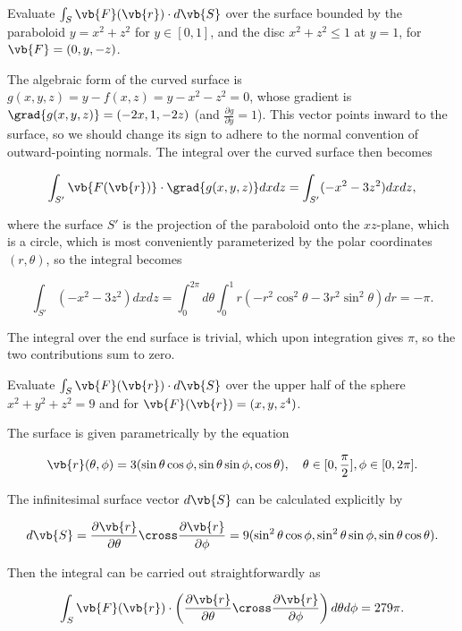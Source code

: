 \documentclass[english,a4paper,12pt]{report}
\begin{document}
{Evaluate \(\int_{S}^{}   \vb{F} (\vb{r} )\cdot d\vb{S} \) over the surface bounded by the paraboloid \(y = x^2+z^2\) for \(y \in [0,1]\), and the disc \(x^2+z^2 \le 1\) at \(y=1\), for \(\vb{F} = (0,y,-z)\).}
{The algebraic form of the curved surface is \(g(x,y,z) = y - f(x,z) = y - x^2 - z^2 = 0\), whose gradient is \(\grad{g(x,y,z)} = (-2x,1,-2z) \) (and \(\frac{\partial g}{\partial y} = 1\)). This vector points inward to the surface, so we should change its sign to adhere to the normal convention of outward-pointing normals. The integral over the curved surface then becomes

\begin{equation}
	\int_{S'}^{}   \vb{F(\vb{r} )} \cdot \grad{g(x,y,z)} dxdz = \int_{S'}^{} (-x^2-3z^2)dxdz,
\end{equation}

where the surface \(S'\) is the projection of the paraboloid onto the \(xz\)-plane, which is a circle, which is most conveniently parameterized by the polar coordinates \((r,\theta )\), so the integral becomes

\begin{equation}
	\int_{S'}^{} (-x^2-3z^2)dxdz = \int_{0}^{2\pi } d \theta \int_{0}^{1} r(-r^2\cos ^2\theta - 3r^2\sin ^2\theta )dr = -\pi .   
\end{equation}

The integral over the end surface is trivial, which upon integration gives \(\pi \), so the two contributions sum to zero. 

} 

{Evaluate \(\int_{S}^{} \vb{F} (\vb{r} ) \cdot d\vb{S}  \) over the upper half of the sphere \(x^2+y^2+z^2 = 9\) and for \(\vb{F} (\vb{r} ) = (x,y,z^4)\).}
{The surface is given parametrically by the equation 

\begin{equation}
	\vb{r} (\theta , \phi ) = 3(\sin \theta \cos \phi , \sin \theta \sin \phi , \cos \theta ), \quad \theta \in [0,\frac{\pi }{2} ], \phi \in [0, 2\pi ].
\end{equation}

The infinitesimal surface vector \(d\vb{S} \) can be calculated explicitly by 

\begin{equation}
	d\vb{S} = \frac{\partial \vb{r} }{\partial \theta } \cross \frac{\partial \vb{r} }{\partial \phi } = 9(\sin ^2\theta \cos \phi , \sin ^2\theta \sin \phi , \sin \theta \cos \theta ).   
\end{equation}

Then the integral can be carried out straightforwardly as

\begin{equation}
	\int_{S}^{} \vb{F} (\vb{r} ) \cdot \left( \frac{\partial \vb{r} }{\partial \theta } \cross \frac{\partial \vb{r} }{\partial \phi }   \right) d \theta d\phi = 279\pi .  
\end{equation}

} 
\end{document}
